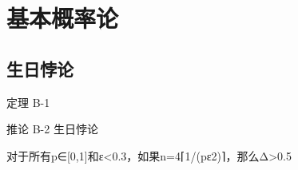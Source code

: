 \chapter{基本概率论}

\section{生日悖论}\label{sec:B-1}

\begin{theorem}\label{theo:B-1}
	定理 B-1
\end{theorem}

\begin{corollary}\label{cor:B-2}
	推论 B-2 生日悖论
\end{corollary}

\begin{theorem}\label{theo:B-3}
对于所有p∈[0,1]和ε<0.3，如果n=4⌈1/(pε2)⌉，那么Δ>0.5
\end{theorem}